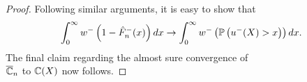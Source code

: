 \begin{proof}
Following similar arguments, it is easy to show that 
$$
\int_0^{\infty} w^-\left(1-{\hat F_n}^-(x)\right)  dx \rightarrow \int_0^{\infty} w^-\left(\mathbb{P}\left( u^-(X)>x \right)\right) dx.
$$
The final claim regarding the almost sure convergence of \\$\overline {\mathbb{C}}_n$ to $\mathbb{C}(X)$ now follows.
\end{proof}

%
%
